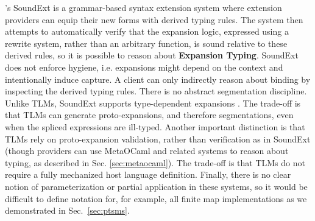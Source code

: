 \documentclass[acmsmall]{acmart}
\begin{document}
\citet{conf/icfp/LorenzenE13,conf/popl/LorenzenE16}'s SoundExt is a grammar-based syntax extension system where extension providers can equip their new forms with derived typing rules. The system then attempts to automatically verify that the expansion logic, expressed using a rewrite system, rather than an arbitrary function, is sound relative to these derived rules, so it is possible to reason about \textbf{Expansion Typing}. SoundExt does not enforce hygiene, i.e. expansions might depend on the context and intentionally induce capture. A client can only indirectly reason about binding by inspecting the derived typing rules. There is no abstract segmentation discipline. Unlike TLMs, SoundExt supports type-dependent expansions \cite{conf/popl/LorenzenE16}. The trade-off is that TLMs can generate proto-expansions, and therefore segmentations, even when the spliced expressions are ill-typed. Another important distinction is that TLMs rely on proto-expansion validation, rather than verification as in SoundExt (though providers can use MetaOCaml and related systems to reason about typing, as described in Sec. \ref{sec:metaocaml}). The trade-off is that TLMs do not require a fully mechanized host language definition. Finally, there is no clear notion of parameterization or partial application in these systems, so it would be difficult to define notation for, for example, all finite map implementations as we demonstrated in Sec.~\ref{sec:ptsms}.



\end{document}
